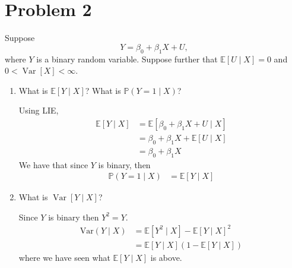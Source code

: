 \documentclass[11pt]{article}
\newcommand{\Var}{\text{Var}}
\newcommand{\bbE}{\mathbb{E}}
\newcommand{\bbP}{\mathbb{P}}
\begin{document}
\newpage
\section*{Problem 2 \heart}

Suppose
\[
Y = \beta_0 + \beta_1 X + U,
\]
where \( Y \) is a binary random variable. Suppose further that \( \mathbb{E}[U \mid X] = 0 \) and \( 0 < \operatorname{Var}[X] < \infty \).

\begin{enumerate}[label=(\alph*)]
    \item What is \( \mathbb{E}[Y \mid X] \)? What is \( \mathbb{P}(Y = 1 \mid X) \)?
    \begin{solution}
        Using LIE, 
        \begin{align*}
            \bbE[Y \mid X] &= \bbE[\beta_0 + \beta_1 X + U \mid X]\\
            &= \beta_0 + \beta_1X + \bbE[U \mid X]\\
            &= \beta_0 + \beta_1 X
        \end{align*}
        We have that since $Y$ is binary, then
        \begin{align*}
            \bbP(Y = 1 \mid X) &= \bbE[Y \mid X]
        \end{align*}
    \end{solution}
    \item What is \( \operatorname{Var}[Y \mid X] \)?
    \begin{solution}
    Since $Y$ is binary then $Y^2 = Y.$ 
    \begin{align*}
        \Var(Y \mid X) &= \bbE[Y^2 \mid X] - \bbE[Y \mid X]^2\\
        &=   \bbE[Y \mid X](1 - \bbE[Y \mid X])
    \end{align*}
    where we have seen what $\bbE[Y \mid X]$ is above.


\end{solution}
\end{enumerate}
\end{document}

